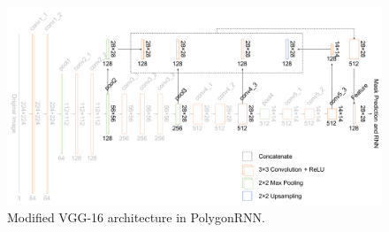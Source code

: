 \begin{figure}[!h]
	\centering
	\includegraphics[width=\fig\textwidth]{3-02.pdf}
    \caption{Modified VGG-16 architecture in PolygonRNN.}
    \label{fig:mdfvgg16}
\end{figure}